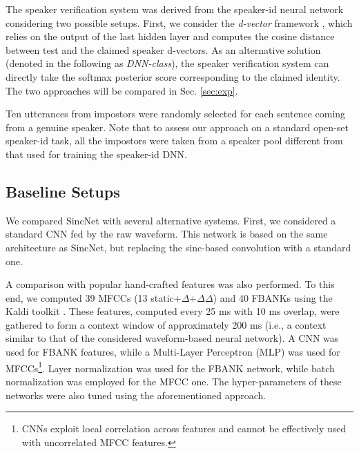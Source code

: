 \documentclass{article}
\begin{document}
The speaker verification system was derived from the speaker-id neural network considering two possible setups. First, we consider the \textit{d-vector} framework \cite{dnn_spk_rec_class2,voxceleb}, which relies on the output of the last hidden layer and computes the cosine  distance between test and the claimed speaker d-vectors. 
As an alternative solution (denoted in the following as \textit{DNN-class}), the speaker verification system can directly take the softmax posterior score corresponding to the claimed identity. The two approaches will be compared in Sec. \ref{sec:exp}.

Ten utterances from impostors were randomly selected for each sentence coming from a genuine speaker. %
Note that to assess our approach on a standard open-set speaker-id task, all the impostors were taken from a speaker pool different from that used for training the speaker-id DNN.

 
\subsection{Baseline Setups}
We compared SincNet with several alternative systems. 
First, we considered a standard CNN fed by the raw waveform. This network is based on the same architecture as SincNet, but replacing the sinc-based convolution with a standard one. 

A comparison with popular hand-crafted features was also performed. To this end, we computed 39 MFCCs (13 static+$\Delta$+$\Delta\Delta$) and 40 FBANKs using the Kaldi toolkit \cite{kaldi_short}. These features,  computed every 25 ms with 10 ms overlap, were gathered to form a context window of approximately 200 ms (i.e., a context similar to that of the considered waveform-based neural network). A CNN was used for FBANK features, while a Multi-Layer Perceptron (MLP) was used for MFCCs\footnote{CNNs exploit local correlation across features and cannot be effectively used with uncorrelated MFCC features.}. Layer normalization was used for the FBANK network, while batch normalization was employed for the MFCC one. The hyper-parameters of these networks were also tuned using the aforementioned approach. %
\end{document}
